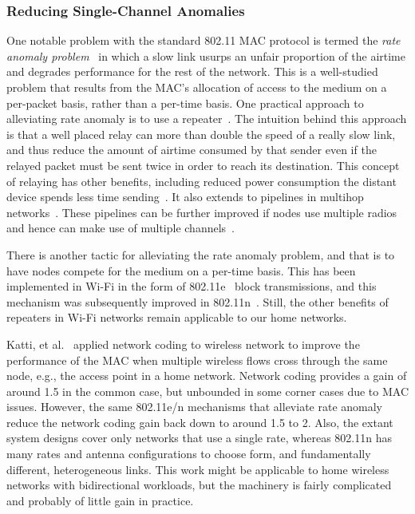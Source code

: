 \subsubsection{Reducing Single-Channel Anomalies}
One notable problem with the standard 802.11 MAC protocol is termed the \emph{rate anomaly problem}~\cite{heusse_anomaly} in which a slow link usurps an unfair proportion of the airtime and degrades performance for the rest of the network. This is a well-studied problem that results from the MAC's allocation of access to the medium on a per-packet basis, rather than a per-time basis. One practical approach to alleviating rate anomaly is to use a repeater~\cite{bahl_repeater}. The intuition behind this approach is that a well placed relay can more than double the speed of a really slow link, and thus reduce the amount of airtime consumed by that sender even if the relayed packet must be sent twice in order to reach its destination. This concept of relaying has other benefits, including reduced power consumption the distant device spends less time sending~\cite{bahl_multiradio}. It also extends to pipelines in multihop networks~\cite{rodrig_thesis}. These pipelines can be further improved if nodes use multiple radios and hence can make use of multiple channels~\cite{bahl_multiradio}.

There is another tactic for alleviating the rate anomaly problem, and that is to have nodes compete for the medium on a per-time basis. This has been implemented in Wi-Fi in the form of 802.11e~\cite{80211} block transmissions, and this mechanism was subsequently improved in 802.11n~\cite{80211n}. Still, the other benefits of repeaters in Wi-Fi networks remain applicable to our home networks.

Katti, et al.~\cite{katti_xors} applied network coding to wireless network to improve the performance of the MAC when multiple wireless flows cross through the same node, e.g., the access point in a home network. Network coding provides a gain of around 1.5 in the common case, but unbounded in some corner cases due to MAC issues. However, the same 802.11e/n mechanisms that alleviate rate anomaly reduce the network coding gain back down to around 1.5 to 2. Also, the extant system designs cover only networks that use a single rate, whereas 802.11n has many rates and antenna configurations to choose form, and fundamentally different, heterogeneous links. This work might be applicable to home wireless networks with bidirectional workloads, but the machinery is fairly complicated and probably of little gain in practice.

